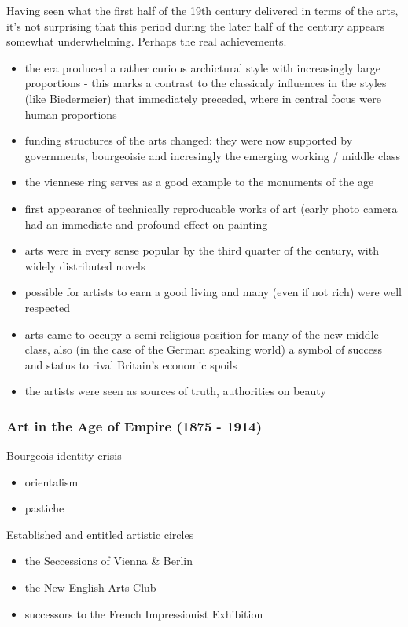 \documentclass[11pt]{article}
\begin{document}
Having seen what the first half of the 19th century delivered in terms
of the arts, it's not surprising that this period during the later half of
the century appears somewhat underwhelming. Perhaps the real
achievements.
\begin{itemize}
\item the era produced a rather curious archictural style with
increasingly large proportions - this marks a contrast to the
classicaly influences in the styles (like Biedermeier) that
immediately preceded, where in central focus were human proportions
\item funding structures of the arts changed: they were now supported by
governments, bourgeoisie and incresingly the emerging working /
middle class
\item the viennese ring serves as a good example to the monuments of the age
\item first appearance of technically reproducable works of art (early
photo camera had an immediate and profound effect on painting
\item arts were in every sense popular by the third quarter of the
century, with widely distributed novels
\item possible for artists to earn a good living and many (even if not
rich) were well respected
\item arts came to occupy a semi-religious position for many of the new
middle class, also (in the case of the German speaking world) a
symbol of success and status to rival Britain's economic spoils
\item the artists were seen as sources of truth, authorities on beauty
\end{itemize}



\subsubsection{Art in the Age of Empire (1875 - 1914)}
\label{sec:org8483583}
Bourgeois identity crisis
\begin{itemize}
\item orientalism
\item pastiche
\end{itemize}

Established and entitled artistic circles 
\begin{itemize}
\item the Seccessions of Vienna \& Berlin
\item the New English Arts Club
\item successors to the French Impressionist Exhibition
\end{itemize}
\end{document}
